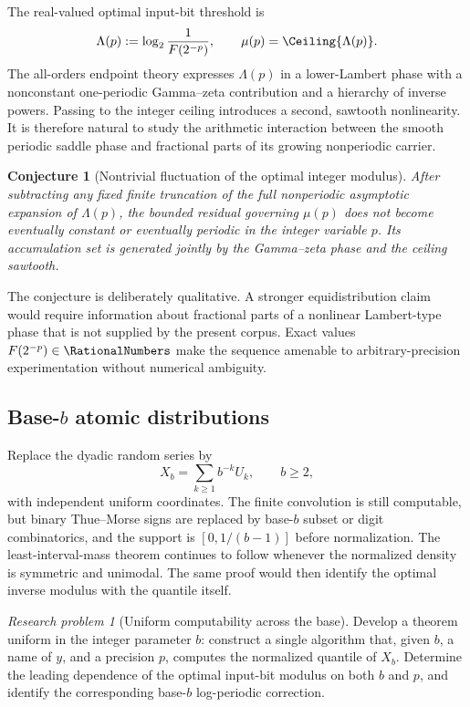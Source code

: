 \documentclass[11pt,oneside]{article}
\newtheorem{conjecture}[theorem]{Conjecture}
\theoremstyle{definition}
\theoremstyle{remark}
\numberwithin{equation}{section}
\newtheorem{problem}[theorem]{Research problem}
\begin{document}
The real-valued optimal input-bit threshold is
\[
 \Lambda(p):=\log_2\frac1{F(2^{-p})},
 \qquad \mu(p)=\Ceiling{\Lambda(p)}.
\]
The all-orders endpoint theory expresses $\Lambda(p)$ in a lower-Lambert
phase with a nonconstant one-periodic Gamma--zeta contribution and a hierarchy
of inverse powers.  Passing to the integer ceiling introduces a second,
sawtooth nonlinearity.  It is therefore natural to study the arithmetic
interaction between the smooth periodic saddle phase and fractional parts of
its growing nonperiodic carrier.

\begin{conjecture}[Nontrivial fluctuation of the optimal integer modulus]
\label{conj:integer-modulus}
After subtracting any fixed finite truncation of the full nonperiodic
asymptotic expansion of $\Lambda(p)$, the bounded residual governing
$\mu(p)$ does not become eventually constant or eventually periodic in the
integer variable $p$.  Its accumulation set is generated jointly by the
Gamma--zeta phase and the ceiling sawtooth.
\end{conjecture}

The conjecture is deliberately qualitative.  A stronger equidistribution
claim would require information about fractional parts of a nonlinear
Lambert-type phase that is not supplied by the present corpus.  Exact values
$F(2^{-p})\in\RationalNumbers$ make the sequence amenable to arbitrary-precision
experimentation without numerical ambiguity.

\subsection{Base-\texorpdfstring{$b$}{b} atomic distributions}

Replace the dyadic random series by
\[
 X_b=\sum_{k\ge1}b^{-k}U_k,
 \qquad b\ge2,
\]
with independent uniform coordinates.  The finite convolution is still
computable, but binary Thue--Morse signs are replaced by base-$b$ subset or
digit combinatorics, and the support is $[0,1/(b-1)]$ before normalization.
The least-interval-mass theorem continues to follow whenever the normalized
density is symmetric and unimodal.  The same proof would then identify the
optimal inverse modulus with the quantile itself.

\begin{problem}[Uniform computability across the base]
Develop a theorem uniform in the integer parameter $b$: construct a single
algorithm that, given $b$, a name of $y$, and a precision $p$, computes the
normalized quantile of $X_b$.  Determine the leading dependence of the
optimal input-bit modulus on both $b$ and $p$, and identify the corresponding
base-$b$ log-periodic correction.
\end{problem}
\end{document}
